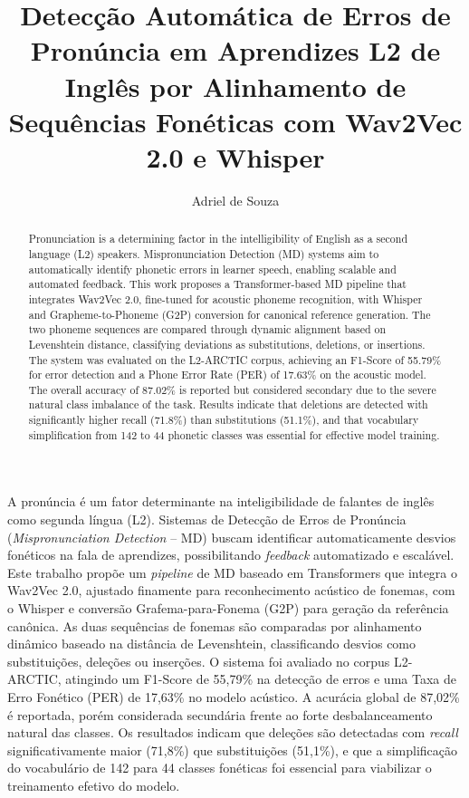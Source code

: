 \documentclass[12pt]{article}
\title{Detecção Automática de Erros de Pronúncia em Aprendizes L2 de Inglês por Alinhamento de Sequências Fonéticas com Wav2Vec 2.0 e Whisper}
\author{Adriel de Souza\inst{1}}
\begin{document}
\maketitle

\begin{abstract}
Pronunciation is a determining factor in the intelligibility of English as a second language (L2) speakers. Mispronunciation Detection (MD) systems aim to automatically identify phonetic errors in learner speech, enabling scalable and automated feedback. This work proposes a Transformer-based MD pipeline that integrates Wav2Vec 2.0, fine-tuned for acoustic phoneme recognition, with Whisper and Grapheme-to-Phoneme (G2P) conversion for canonical reference generation. The two phoneme sequences are compared through dynamic alignment based on Levenshtein distance, classifying deviations as substitutions, deletions, or insertions. The system was evaluated on the L2-ARCTIC corpus, achieving an F1-Score of 55.79\% for error detection and a Phone Error Rate (PER) of 17.63\% on the acoustic model. The overall accuracy of 87.02\% is reported but considered secondary due to the severe natural class imbalance of the task. Results indicate that deletions are detected with significantly higher recall (71.8\%) than substitutions (51.1\%), and that vocabulary simplification from 142 to 44 phonetic classes was essential for effective model training.
\end{abstract}

\begin{resumo}
A pronúncia é um fator determinante na inteligibilidade de falantes de inglês como segunda língua (L2). Sistemas de Detecção de Erros de Pronúncia (\textit{Mispronunciation Detection} -- MD) buscam identificar automaticamente desvios fonéticos na fala de aprendizes, possibilitando \textit{feedback} automatizado e escalável. Este trabalho propõe um \textit{pipeline} de MD baseado em Transformers que integra o Wav2Vec 2.0, ajustado finamente para reconhecimento acústico de fonemas, com o Whisper e conversão Grafema-para-Fonema (G2P) para geração da referência canônica. As duas sequências de fonemas são comparadas por alinhamento dinâmico baseado na distância de Levenshtein, classificando desvios como substituições, deleções ou inserções. O sistema foi avaliado no corpus L2-ARCTIC, atingindo um F1-Score de 55,79\% na detecção de erros e uma Taxa de Erro Fonético (PER) de 17,63\% no modelo acústico. A acurácia global de 87,02\% é reportada, porém considerada secundária frente ao forte desbalanceamento natural das classes. Os resultados indicam que deleções são detectadas com \textit{recall} significativamente maior (71,8\%) que substituições (51,1\%), e que a simplificação do vocabulário de 142 para 44 classes fonéticas foi essencial para viabilizar o treinamento efetivo do modelo.
\end{resumo}
\end{document}
